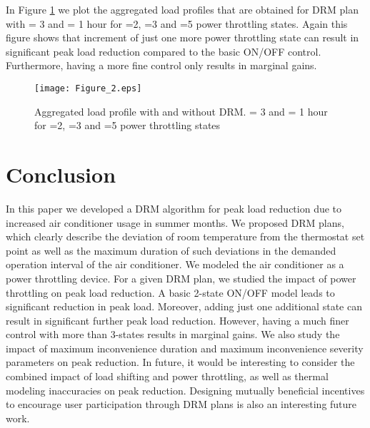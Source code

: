 \documentclass[10pt,twocolumn,twoside]{IEEEtran}
\begin{document}
In Figure \ref{fig:fig002} we plot the aggregated load profiles that are obtained for DRM plan with  = 3 and  = 1 hour for =2, =3 and =5 power throttling states. Again this figure shows that increment of just one more power throttling state can result in significant peak load reduction compared to the basic ON/OFF control. Furthermore, having a more fine control only results in marginal gains.  

\begin{figure}[htb]
\centering
\texttt{[image: Figure\_2.eps]}
\caption{Aggregated load profile with and without DRM.  = 3 and  = 1 hour for =2, =3 and =5 power throttling states} 
\label{fig:fig002}
\end{figure}

\section{Conclusion}
In this paper we developed a DRM algorithm for peak load reduction due to increased air conditioner usage in summer months. We proposed DRM plans, which clearly describe the deviation of room temperature from the thermostat set point as well as the maximum duration of such deviations in the demanded operation interval of the air conditioner. We modeled the air conditioner as a power throttling device. For a given DRM plan, we studied the impact of power throttling on peak load reduction. A basic 2-state ON/OFF model leads to significant reduction in peak load. Moreover, adding just one additional state can result in significant further peak load reduction. However, having a much finer control with more than 3-states results in marginal gains. We also study the impact of maximum inconvenience duration and maximum inconvenience severity parameters on peak reduction. In future, it would be interesting to consider the combined impact of load shifting and power throttling, as well as thermal modeling inaccuracies on peak reduction. Designing mutually beneficial incentives to encourage user participation through DRM plans is also an interesting future work.  
\end{document}
